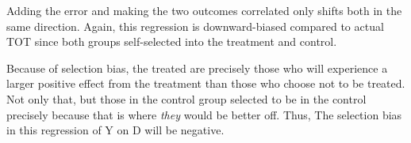 \documentclass[12pt]{article}
\begin{document}
Adding the error and making the two outcomes correlated only shifts both in the same direction. Again, this regression is downward-biased compared to actual TOT since both groups self-selected into the treatment and control. 

\vem
{}

Because of selection bias, the treated are precisely those who will experience a larger positive effect from the treatment than those who choose not to be treated. Not only that, but those in the control group selected to be in the control precisely because that is where \textit{they} would be better off. Thus, The selection bias in this regression of Y on D will be negative.
\end{document}
